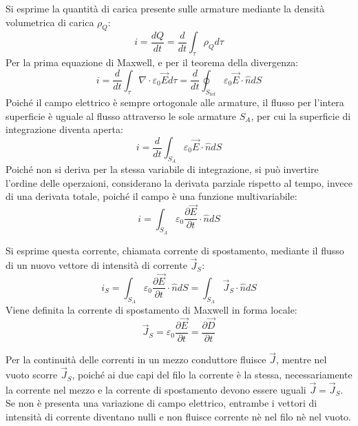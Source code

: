\documentclass{article}
\numberwithin{equation}{subsection}
\begin{document}
Si esprime la quantità di carica presente sulle armature mediante la densità volumetrica di carica $\rho_Q$:
\begin{equation*}
    i=\displaystyle\frac{dQ}{dt}=\frac{d}{dt}\int_{\tau}\rho_Qd\tau
\end{equation*}
Per la prima equazione di Maxwell, e per il teorema della divergenza: 
\begin{equation*}
    i=\displaystyle\frac{d}{dt}\int_{\tau}\nabla\cdot\varepsilon_0\vec{E}d\tau=\frac{d}{dt}\oint_{S_{tot}}\varepsilon_0\vec{E}\cdot\hat{n}dS
\end{equation*}
Poiché il campo elettrico è sempre ortogonale alle armature, il flusso per l'intera superficie è uguale al flusso attraverso le sole armature $S_A$, per cui la superficie 
di integrazione diventa aperta:
\begin{equation*}
    i=\displaystyle\frac{d}{dt}\int_{S_A}\varepsilon_0\vec{E}\cdot\hat{n}dS
\end{equation*}
Poiché non si deriva per la stessa variabile di integrazione, si può invertire l'ordine delle operzaioni, considerano la derivata parziale rispetto al tempo, invece di una 
derivata totale, poiché il campo è una funzione multivariabile:
\begin{equation*}
    i=\displaystyle\int_{S_A}\varepsilon_0\frac{\partial \vec{E}}{\partial t}\cdot\hat{n}dS
\end{equation*}

Si esprime questa corrente, chiamata corrente di spostamento, mediante il flusso di un nuovo vettore di intensità di corrente $\vec{J}_S$:
\begin{equation*}
    i_S=\displaystyle\int_{S_A}\varepsilon_0\frac{\partial \vec{E}}{\partial t}\cdot\hat{n}dS=\int_{S_A}\vec{J}_S\cdot\hat{n}dS
\end{equation*}
Viene definita la corrente di spostamento di Maxwell in forma locale:
\begin{equation}
    \vec{J}_S=\displaystyle\varepsilon_0\frac{\partial \vec{E}}{\partial t}=\frac{\partial \vec{D}}{\partial t}
\end{equation}

Per la continuità delle correnti in un mezzo conduttore fluisce $\vec{J}$, mentre nel vuoto scorre $\vec{J}_S$, poiché ai due capi del filo la corrente è la stessa, necessariamente 
la corrente nel mezzo e la corrente di spostamento devono essere uguali $\vec{J}=\vec{J}_S$. Se non è presenta una variazione di campo elettrico, entrambe i vettori 
di intensità di corrente diventano nulli e non fluisce corrente nè nel filo nè nel vuoto.  
\end{document}
